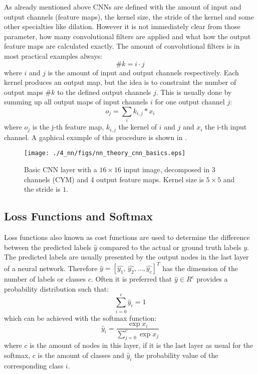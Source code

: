 As already mentioned above CNNs are defined with the amount of input and output channels (feature maps), the kernel size, the stride of the kernel and some other specialties like dilation.
However it is not immediately clear from those parameter, how many convolutional filters are applied and what how the output feature maps are calculated exactly.
The amount of convolutional filters is in most practical examples always:
\begin{equation}\label{eq:nn_theory_n_filters}
  \#k = i \cdot j
\end{equation}
where $i$ and $j$ is the amount of input and output channels respectively.
Each kernel produces an output map, but the idea is to constraint the number of output maps $\#k$ to the defined output channels $j$.
This is usually done by summing up all output maps of input channels $i$ for one output channel $j$:
\begin{equation}
  o_j = \sum_{i} k_{i, j} * x_i
\end{equation}
where $o_j$ is the j-th feature map, $k_{i, j}$ the kernel of $i$ and $j$ and $x_i$ the i-th input channel.
A gaphical example of this procedure is shown in .
\begin{figure}[!ht]
  \centering
    \texttt{[image: ./4\_nn/figs/nn\_theory\_cnn\_basics.eps]}
  \caption{Basic CNN layer with a $16 \times 16$ input image, decomposed in 3 channels (CYM) and 4 output feature maps. Kernel size is $5 \times 5$ and the stride is $1$.}
  \label{fig:nn_theory_cnn_basics}
\end{figure}
\FloatBarrier
\noindent



\subsection{Loss Functions and Softmax}
Loss functions also known as cost functions are used to determine the difference between the predicted labels $\hat{y}$ compared to the actual or ground truth labels $y$.
The predicted labels are usually presented by the output nodes in the last layer of a neural network.
Therefore $\hat{y} = [\hat{y_1}, \, \hat{y_2}, \dots, \hat{y_c}]^T$ has the dimension of the number of labels or classes $c$.
Often it is preferred that $\hat{y} \in R^c$ provides a probability distribution such that:
\begin{equation}
  \sum_{i=0}^c \hat{y}_i = 1
\end{equation}
which can be achieved with the softmax function:
\begin{equation}\label{eq:nn_theory_softmax}
  \hat{y}_i = \frac{\exp{x_i}}{\sum_{j=0}^{c}\exp{x_j}}
\end{equation}
where $c$ is the amount of nodes in this layer, if it is the last layer as usual for the softmax, $c$ is the amount of classes and $\hat{y}_i$ the probability value of the corresponding class $i$.

